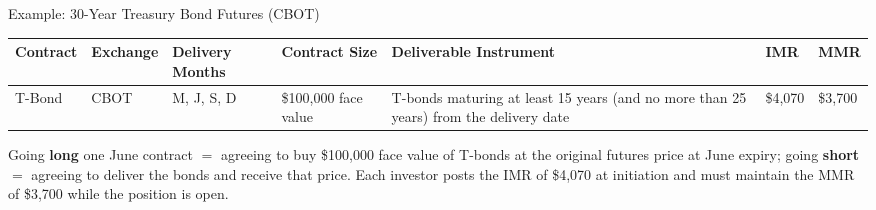 \documentclass[aspectratio=169]{beamer}
\begin{document}
\begin{frame}{Example: 30-Year Treasury Bond Futures (CBOT)}
\begin{table}
\centering
\footnotesize
\setlength{\tabcolsep}{3pt}
\begin{tabular}{p{}p{}p{}p{}p{}p{}p{}}
\toprule
\textbf{Contract} & \textbf{Exchange} & \textbf{Delivery Months} & \textbf{Contract Size} & \textbf{Deliverable Instrument} & \textbf{IMR} & \textbf{MMR} \\
\midrule
T-Bond & CBOT & M, J, S, D & \$100{,}000 face value & T-bonds maturing at least 15 years (and no more than 25 years) from the delivery date & \$4{,}070 & \$3{,}700 \\
\bottomrule
\end{tabular}
\end{table}
\vspace{0.2em}
Going \textbf{long} one June contract $=$ agreeing to buy \$100{,}000 face value of T-bonds at the original futures price at June expiry; going \textbf{short} $=$ agreeing to deliver the bonds and receive that price. Each investor posts the IMR of \$4{,}070 at initiation and must maintain the MMR of \$3{,}700 while the position is open.
\end{frame}
\end{document}
